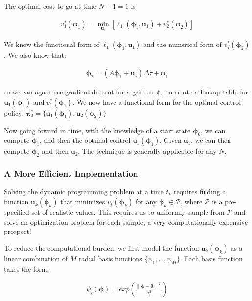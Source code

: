 \documentclass{article} %
\begin{document}
The optimal cost-to-go at time $N-1=1$ is

\begin{align*}
v^*_{1} \left( \bm{\phi}_{1} \right) = \min_{\bm{u}_{1}} \left[ \ell_1 \left( \bm{\phi}_{1}, \bm{u}_{1} \right) + v^*_2 \left( \bm{\phi}_2 \right) \right]
\end{align*}

We know the functional form of $\ell_1 \left( \bm{\phi}_{1}, \bm{u}_{1} \right)$ and the
numerical form of $v^*_2 \left( \bm{\phi}_2 \right)$. We also know that:

\begin{align*}
\bm{\phi}_2 = \left( A\bm{\phi}_1 + \bm{u}_1 \right) \Delta\tau + \bm{\phi}_1
\end{align*}

so we can again use gradient descent for a grid on $\bm{\phi}_1$ to create a lookup
table for $\bm{u}_1(\bm{\phi}_1)$ and $v^*_1 \left( \bm{\phi}_1 \right)$. We now have
a functional form for the optimal control policy: $\bm{\pi}_0^* = \{ \bm{u}_1(\bm{\phi}_1), \bm{u}_2(\bm{\phi}_2) \}$

Now going foward in time, with the knowledge of a start state $\bm{\phi}_0$, we can 
compute $\bm{\phi}_1$, and then the optimal control $\bm{u}_1 \left( \bm{\phi}_1 \right)$.
Given $\bm{u}_1$, we can then compute $\bm{\phi}_2$ and then $\bm{u}_2$. The technique
is generally applicable for any $N$.


\subsubsection{A More Efficient Implementation}

Solving the dynamic programming problem at a time $t_k$ requires finding a function
$\bm{u}_k(\bm{\phi}_k)$ that minimizes $v_k(\bm{\phi}_k)$ for any
$\bm{\phi}_k \in \mathcal{P}$, where $\mathcal{P}$ is a pre-specified
set of realistic values. This requires us to uniformly
sample from $\mathcal{P}$ and solve an optimization problem for each sample, a
very computationally expensive prospect!

To reduce the computational burden, we first model the function $\bm{u}_k(\bm{\phi}_k)$
as a linear combination of $M$ radial basis functions
$\{ \psi_1, ..., \psi_M \}$. Each basis function takes the form:

\begin{align*}
\psi_i(\bm{\phi}) = exp \left( \frac{\| \bm{\phi} - \bm{\theta}_i \| ^2 }{\sigma_i ^2} \right) 
\end{align*}
\end{document}

